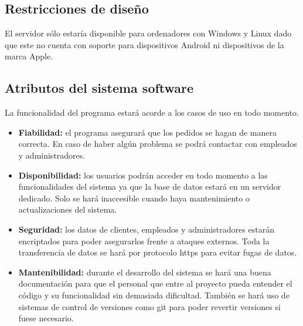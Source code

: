 \subsection{Restricciones de diseño}
El servidor sólo estaría disponible para ordenadores con Windows y Linux dado que este no cuenta con soporte para dispositivos Android ni dispositivos de la marca Apple.
\subsection{Atributos del sistema software}
La funcionalidad del programa estará acorde a los casos de uso en todo momento.
\begin{itemize}
    \item\textbf{Fiabilidad:} el programa asegurará que los pedidos se hagan de manera correcta. En caso de haber algún problema se podrá contactar con empleados y administradores.
    \item\textbf{Disponibilidad:} los usuarios podrán acceder en todo momento a las funcionalidades del sistema ya que la base de datos estará en un servidor dedicado. Solo se hará inaccesible cuando haya mantenimiento o actualizaciones del sistema.
    \item\textbf{Seguridad:} los datos de clientes, empleados y administradores estarán encriptados para poder asegurarlos frente a ataques externos. Toda la transferencia de datos se hará por protocolo \gls{https} para evitar fugas de datos.
    \item\textbf{Mantenibilidad:} durante el desarrollo del sistema se hará una buena documentación para que el personal que entre al proyecto pueda entender el código y su funcionalidad sin demasiada dificultad. También se hará uso de sistemas de control de versiones como git para poder revertir versiones si fuese necesario.
\end{itemize}
